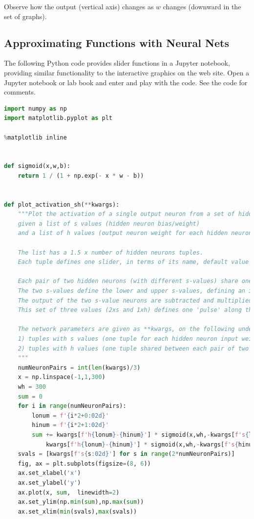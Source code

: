 Observe how the output (vertical axis) changes as $w$ changes (downward in the set of graphs).


\subsection{Approximating Functions with Neural Nets}
\label{sec:ApproximatingFunctionswithNeuralNets}

The following Python code provides slider functions in a Jupyter notebook, providing similar functionality to the interactive graphics on the web site.  Open a Jupyter notebook or lab book and enter and play with the code.  See the code for comments.

\begin{lstlisting}[language=Python]
import numpy as np
import matplotlib.pyplot as plt

%matplotlib inline


def sigmoid(x,w,b):
    return 1 / (1 + np.exp(- x * w - b))
    

def plot_activation_sh(**kwargs):
    """Plot the activation of a single output neuron from a set of hidden neurons,
    given a list of s values (hidden neuron bias/weight)
    and a list of h values (output neuron weight for each hidden neuron).
    
    The list has a 1.5 x number of hidden neurons tuples.
    Each tuple defines one slider, in terms of its name, default value and lo/hi limits.
    
    Each pair of two hidden neurons (with different s-values) share one h-weight value.
    The two s-values define the lower and upper s-values, defining an interval on the x axis.
    The output of the two s-value neurons are subtracted and multiplied with the h-weight value.
    This set of three values (2xs and 1xh) defines one 'pulse' along the x-axis with height h.
    
    The network parameters are given as **kwargs, on the following understanding:
    1) tuples with s values (one tuple for each hidden neuron input weight, s=bias/weight)
    2) tuples with h values (one tuple shared between each pair of two hidden neurons)
    """
    numNeuronPairs = int(len(kwargs)/3)
    x = np.linspace(-1,1,300)
    wh = 300
    sum = 0
    for i in range(numNeuronPairs):
        lonum = f'{i*2+0:02d}'
        hinum = f'{i*2+1:02d}'
        sum += kwargs[f'h{lonum}-{hinum}'] * sigmoid(x,wh,-kwargs[f's{lonum}']*wh) - \
            kwargs[f'h{lonum}-{hinum}'] * sigmoid(x,wh,-kwargs[f's{hinum}']*wh) 
    svals = [kwargs[f's{s:02d}'] for s in range(2*numNeuronPairs)]
    fig, ax = plt.subplots(figsize=(8, 6))
    ax.set_xlabel('x')
    ax.set_ylabel('y')
    ax.plot(x, sum,  linewidth=2)
    ax.set_ylim(np.min(sum),np.max(sum))
    ax.set_xlim(min(svals),max(svals))


\end{lstlisting}
